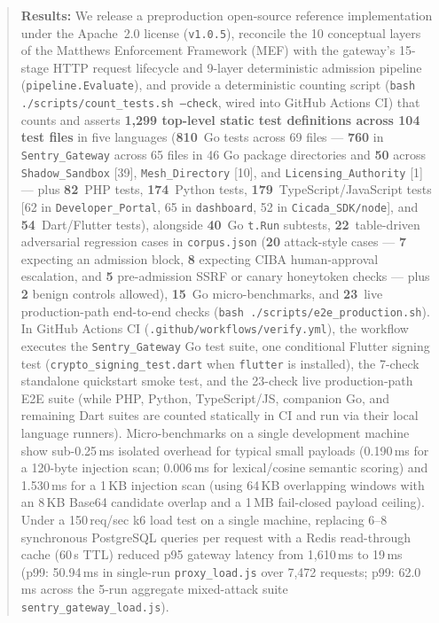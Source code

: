 \documentclass[11pt, a4paper]{article}
\begin{document}
\begin{abstract}
\noindent\textbf{Results:} We release a preproduction open-source reference implementation under the Apache~2.0 license (\texttt{v1.0.5}), reconcile the 10 conceptual layers of the Matthews Enforcement Framework (MEF) with the gateway's 15-stage HTTP request lifecycle and 9-layer deterministic admission pipeline (\texttt{pipeline.Evaluate}), and provide a deterministic counting script (\texttt{bash ./scripts/count\_tests.sh --check}, wired into GitHub Actions CI) that counts and asserts \textbf{1,299 top-level static test definitions across 104 test files} in five languages (\textbf{810}~Go tests across 69 files --- \textbf{760} in \texttt{Sentry\_Gateway} across 65 files in 46 Go package directories and \textbf{50} across \texttt{Shadow\_Sandbox} [39], \texttt{Mesh\_Directory} [10], and \texttt{Licensing\_Authority} [1] --- plus \textbf{82}~PHP tests, \textbf{174}~Python tests, \textbf{179}~TypeScript/JavaScript tests [62 in \texttt{Developer\_Portal}, 65 in \texttt{dashboard}, 52 in \texttt{Cicada\_SDK/node}], and \textbf{54}~Dart/Flutter tests), alongside \textbf{40}~Go \texttt{t.Run} subtests, \textbf{22}~table-driven adversarial regression cases in \texttt{corpus.json} (\textbf{20} attack-style cases --- \textbf{7} expecting an admission block, \textbf{8} expecting CIBA human-approval escalation, and \textbf{5} pre-admission SSRF or canary honeytoken checks --- plus \textbf{2} benign controls allowed), \textbf{15}~Go micro-benchmarks, and \textbf{23}~live production-path end-to-end checks (\texttt{bash ./scripts/e2e\_production.sh}). In GitHub Actions CI (\texttt{.github/workflows/verify.yml}), the workflow executes the \texttt{Sentry\_Gateway} Go test suite, one conditional Flutter signing test (\texttt{crypto\_signing\_test.dart} when \texttt{flutter} is installed), the 7-check standalone quickstart smoke test, and the 23-check live production-path E2E suite (while PHP, Python, TypeScript/JS, companion Go, and remaining Dart suites are counted statically in CI and run via their local language runners). Micro-benchmarks on a single development machine show sub-0.25\,ms isolated overhead for typical small payloads (0.190\,ms for a 120-byte injection scan; 0.006\,ms for lexical/cosine semantic scoring) and 1.530\,ms for a 1\,KB injection scan (using 64\,KB overlapping windows with an 8\,KB Base64 candidate overlap and a 1\,MB fail-closed payload ceiling). Under a 150\,req/sec k6 load test on a single machine, replacing 6--8 synchronous PostgreSQL queries per request with a Redis read-through cache (60\,s TTL) reduced p95 gateway latency from 1,610\,ms to 19\,ms (p99: 50.94\,ms in single-run \texttt{proxy\_load.js} over 7,472 requests; p99: 62.0\,ms across the 5-run aggregate mixed-attack suite \texttt{sentry\_gateway\_load.js}).


\end{abstract}
\end{document}
